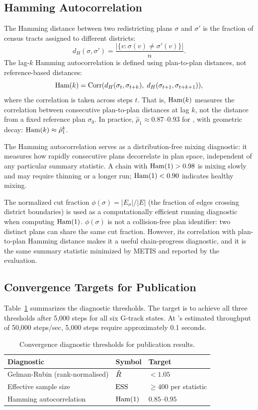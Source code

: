 \subsection{Hamming Autocorrelation}

The Hamming distance between two redistricting plans $\sigma$ and $\sigma'$
is the fraction of census tracts assigned to different districts:
\[
  d_H(\sigma, \sigma') = \frac{|\{v : \sigma(v) \neq \sigma'(v)\}|}{n}.
\]
The lag-$k$ Hamming autocorrelation is defined using plan-to-plan
distances, not reference-based distances:
\[
  \mathrm{Ham}(k) = \mathrm{Corr}(d_H(\sigma_t, \sigma_{t+k}),\; d_H(\sigma_{t+1}, \sigma_{t+k+1})),
\]
where the correlation is taken across steps $t$.
That is, $\mathrm{Ham}(k)$ measures the correlation between consecutive
plan-to-plan distances at lag $k$, not the distance from a fixed
reference plan $\sigma_0$.
In practice, $\hat{\rho}_1 \approx 0.87$--$0.93$ for \recom{}, with
geometric decay: $\mathrm{Ham}(k) \approx \hat{\rho}_1^k$.

The Hamming autocorrelation serves as a distribution-free mixing
diagnostic: it measures how rapidly consecutive plans decorrelate in
plan space, independent of any particular summary statistic.
A chain with $\mathrm{Ham}(1) > 0.98$ is mixing slowly and may require
thinning or a longer run; $\mathrm{Ham}(1) < 0.90$ indicates healthy mixing.

The normalized cut fraction $\phi(\sigma) = |E_\sigma| / |E|$
(the fraction of edges crossing district boundaries) is used as a
computationally efficient running diagnostic when computing $\mathrm{Ham}(1)$.
$\phi(\sigma)$ is not a collision-free plan identifier: two distinct
plans can share the same cut fraction.
However, its correlation with plan-to-plan Hamming distance makes it
a useful chain-progress diagnostic, and it is the same summary statistic
minimized by METIS and reported by the \ar{} evaluation.

\subsection{Convergence Targets for Publication}

Table~\ref{tab:diag-targets} summarizes the diagnostic thresholds.
The target is to achieve all three thresholds after 5{,}000 steps for
all six G-track states.
At \re{}'s estimated throughput of 50{,}000 steps/sec, 5{,}000 steps
require approximately 0.1 seconds.

\begin{table}[h]
\centering
\caption{Convergence diagnostic thresholds for \re{} publication results.}
\label{tab:diag-targets}
\begin{tabular}{lll}
\toprule
Diagnostic & Symbol & Target \\
\midrule
Gelman-Rubin (rank-normalised) & $\hat{R}$ & $< 1.05$ \\
Effective sample size & $\mathrm{ESS}$ & $\geq 400$ per statistic \\
Hamming autocorrelation & $\mathrm{Ham}(1)$ & $0.85$--$0.95$ \\
\bottomrule
\end{tabular}
\end{table}
